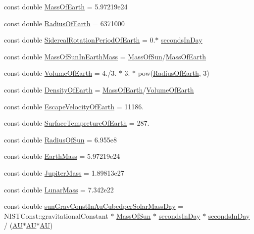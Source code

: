 \begin{DoxyCompactItemize}
const double \mbox{\hyperlink{namespace_e_g_x_phys_ace4a9d8c0b21215536857f4c1087a4e8}{Mass\+Of\+Earth}} = 5.\+97219e24
\item 
const double \mbox{\hyperlink{namespace_e_g_x_phys_a11a2d4a914eb43c4095e225358293a45}{Radius\+Of\+Earth}} = 6371000
\item 
const double \mbox{\hyperlink{namespace_e_g_x_phys_a34a388ac3f9196bb3cdbdbee5ff3cdb7}{Sidereal\+Rotation\+Period\+Of\+Earth}} = 0.$\ast$ \mbox{\hyperlink{namespace_e_g_x_phys_ab4f86327f64403b843077ecc189ce52b}{seconds\+In\+Day}}
\item 
const double \mbox{\hyperlink{namespace_e_g_x_phys_a05709972a6a6089eb968f667ce0bf656}{Mass\+Of\+Sun\+In\+Earth\+Mass}} = \mbox{\hyperlink{namespace_e_g_x_phys_a6e84ae13f1dbcecb215af787bbc12cd6}{Mass\+Of\+Sun}}/\mbox{\hyperlink{namespace_e_g_x_phys_ace4a9d8c0b21215536857f4c1087a4e8}{Mass\+Of\+Earth}}
\item 
const double \mbox{\hyperlink{namespace_e_g_x_phys_a73aaaddeacf5d59643ec5e4a53a1a251}{Volume\+Of\+Earth}} = 4./3. $\ast$ 3. $\ast$ pow(\mbox{\hyperlink{namespace_e_g_x_phys_a11a2d4a914eb43c4095e225358293a45}{Radius\+Of\+Earth}}, 3)
\item 
const double \mbox{\hyperlink{namespace_e_g_x_phys_a2a671e37351b9b7e334385a26a7f7102}{Density\+Of\+Earth}} = \mbox{\hyperlink{namespace_e_g_x_phys_ace4a9d8c0b21215536857f4c1087a4e8}{Mass\+Of\+Earth}}/\mbox{\hyperlink{namespace_e_g_x_phys_a73aaaddeacf5d59643ec5e4a53a1a251}{Volume\+Of\+Earth}}
\item 
const double \mbox{\hyperlink{namespace_e_g_x_phys_a6a8cb7abae15a2f1bbcfd6623f72316c}{Escape\+Velocity\+Of\+Earth}} = 11186.
\item 
const double \mbox{\hyperlink{namespace_e_g_x_phys_a942ce2ac76b5df8b08ec7827d3e20b76}{Surface\+Tempreture\+Of\+Earth}} = 287.
\item 
const double \mbox{\hyperlink{namespace_e_g_x_phys_a983b842cceb4a584787874fc9486384d}{Radius\+Of\+Sun}} = 6.\+955e8
\item 
const double \mbox{\hyperlink{namespace_e_g_x_phys_a9f866a7985fe2676a1e50a3dd175f5b6}{Earth\+Mass}} = 5.\+97219e24
\item 
const double \mbox{\hyperlink{namespace_e_g_x_phys_ad790be322eb318e95b4ea609b4954da9}{Jupiter\+Mass}} = 1.\+89813e27
\item 
const double \mbox{\hyperlink{namespace_e_g_x_phys_a55e13f18ccd52a098969eaa5755c448e}{Lunar\+Mass}} = 7.\+342e22
\item 
const double \mbox{\hyperlink{namespace_e_g_x_phys_ad6c3d6fda98ef1efd005dd096890e981}{sun\+Grav\+Const\+In\+Au\+Cubedper\+Solar\+Mass\+Day}} = N\+I\+S\+T\+Const\+::gravitational\+Constant $\ast$ \mbox{\hyperlink{namespace_e_g_x_phys_a6e84ae13f1dbcecb215af787bbc12cd6}{Mass\+Of\+Sun}} $\ast$ \mbox{\hyperlink{namespace_e_g_x_phys_ab4f86327f64403b843077ecc189ce52b}{seconds\+In\+Day}} $\ast$ \mbox{\hyperlink{namespace_e_g_x_phys_ab4f86327f64403b843077ecc189ce52b}{seconds\+In\+Day}} / (\mbox{\hyperlink{namespace_e_g_x_phys_a999332303a2214425184fbe23dbae0c5}{AU}}$\ast$\mbox{\hyperlink{namespace_e_g_x_phys_a999332303a2214425184fbe23dbae0c5}{AU}}$\ast$\mbox{\hyperlink{namespace_e_g_x_phys_a999332303a2214425184fbe23dbae0c5}{AU}})

\end{DoxyCompactItemize}
